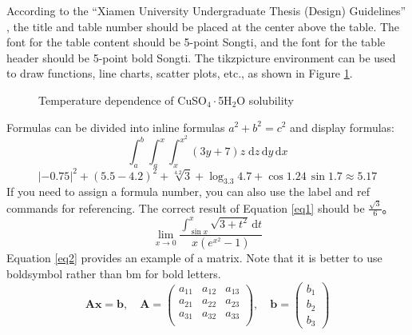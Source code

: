 \documentclass{xmu}
\begin{document}
According to the ``Xiamen University Undergraduate Thesis (Design) Guidelines'' \parencite{xmuthesis}, the title and table number should be placed at the center above the table. The font for the table content should be 5-point Songti, and the font for the table header should be 5-point bold Songti.
The tikzpicture environment can be used to draw functions, line charts, scatter plots, etc., as shown in Figure \ref{plot}.
\begin{figure}[!htbp]
    \centering
    \caption{Temperature dependence of CuSO\(_4\cdot\)5H\(_2\)O solubility}\label{plot}
\end{figure}
Formulas can be divided into inline formulas $a^2+b^2=c^2$ and display formulas:
$$
    \int_a^b\int_a^x\int_x^{x^2}(3y+7)z\;\mathrm{d}z\,\mathrm{d}y\,\mathrm{d}x
$$
$$
    |-0.75|^{2}+(5.5-4.2)^2+\sqrt[4.2]{3}+\log_{3.3}{4.7}+\cos1.24\,\sin1.7\approx5.17
$$
If you need to assign a formula number, you can also use the label and ref commands for referencing. The correct result of Equation \ref{eq1} should be $\frac{\sqrt{3}}{6}$。
\begin{equation}\label{eq1}
    \lim_{x\to0}\frac{\displaystyle{\int_{\sin x}^x\sqrt{3+t^2}\,\mathrm{d}t}}{x(e^{x^2}-1)}
\end{equation}
Equation \ref{eq2} provides an example of a matrix. Note that it is better to use boldsymbol rather than bm for bold letters.
\begin{equation}\label{eq2}
    \boldsymbol{Ax} = \boldsymbol{b},\quad\boldsymbol{A} = \left(\begin{array}{ccc}
            a_{11} & a_{12} & a_{13} \\
            a_{21} & a_{22} & a_{23} \\
            a_{31} & a_{32} & a_{33} \\
        \end{array}\right),\quad \boldsymbol{b}=\left(\begin{array}{c}
            b_1 \\ b_2 \\ b_3\end{array}\right)
\end{equation}
\end{document}
